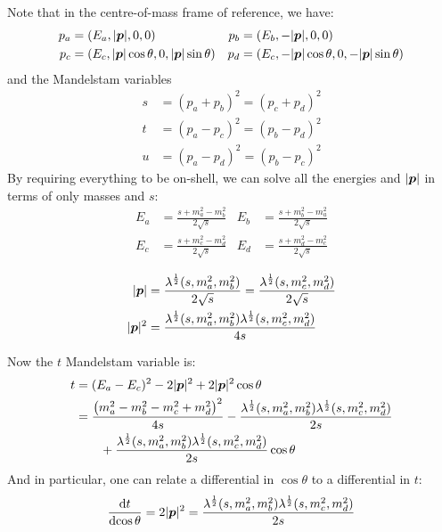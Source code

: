 \documentclass[
  a4paper,             %
  11pt,                %
  oneside,             %
  onecolumn,           %
  bibliography=totoc,  %
  final,               %
]{scrartcl}
\begin{document}
Note that in the centre-of-mass frame of reference, we have:
\begin{align}
  p_a & = (E_a, \lvert\boldsymbol{p}\rvert, 0, 0)                                       & p_b & = (E_b, -\lvert\boldsymbol{p}\rvert, 0, 0) \\
  p_c & = (E_c, \lvert\boldsymbol{p}\rvert \cos \theta, 0, \lvert\boldsymbol{p}\rvert \sin \theta)     &
  p_d & = (E_c, - \lvert\boldsymbol{p}\rvert \cos \theta, 0, - \lvert\boldsymbol{p}\rvert \sin \theta)
\end{align}
and the Mandelstam variables
\begin{align}
  s & = (p_a + p_b)^2 = (p_c + p_d)^2 \\
  t & = (p_a - p_c)^2 = (p_b - p_d)^2 \\
  u & = (p_a - p_d)^2 = (p_b - p_c)^2
\end{align}
By requiring everything to be on-shell, we can solve all the energies and
\(\lvert\boldsymbol{p}\rvert\) in terms of only masses and \(s\):
\begin{align}
  E_a & = \frac{s + m_a^2 - m_b^2}{2 \sqrt{s}} &
  E_b & = \frac{s + m_b^2 - m_a^2}{2 \sqrt{s}}   \\
  E_c & = \frac{s + m_c^2 - m_d^2}{2 \sqrt{s}} &
  E_d & = \frac{s + m_d^2 - m_c^2}{2 \sqrt{s}}   \\
\end{align}
\begin{equation}
  \begin{aligned}
    \lvert\boldsymbol{p}\rvert   & = \frac{\lambda^{\frac{1}{2}}(s, m_a^2, m_b^2)}{2 \sqrt{s}} = \frac{\lambda^{\frac{1}{2}}(s, m_c^2, m_d^2)}{2 \sqrt{s}} \\
    \lvert\boldsymbol{p}\rvert^2 & = \frac{\lambda^{\frac{1}{2}}(s, m_a^2, m_b^2) \lambda^{\frac{1}{2}}(s, m_c^2, m_d^2)}{4 s}
  \end{aligned}
\end{equation}

Now the \(t\) Mandelstam variable is:
\begin{align}
  t & = (E_a - E_c)^2 - 2 \lvert\boldsymbol{p}\rvert^2 + 2 \lvert\boldsymbol{p}\rvert^2 \cos \theta                                                \\
    & = \frac{\left( m_a^2 - m_b^2 - m_c^2 + m_d^2 \right)^2}{4 s}
  - \frac{\lambda^{\frac{1}{2}}(s, m_a^2, m_b^2) \lambda^{\frac{1}{2}}(s, m_c^2, m_d^2)}{2 s}                        \\
    & \qquad + \frac{\lambda^{\frac{1}{2}}(s, m_a^2, m_b^2) \lambda^{\frac{1}{2}}(s, m_c^2, m_d^2)}{2 s} \cos \theta
\end{align}
And in particular, one can relate a differential in \(\cos \theta\) to a differential in \(t\):
\begin{equation}
  \label{eq:t_angular}
  \frac{\mathop{}\!\mathrm{d}{t}}{\mathop{}\!\mathrm{d}{\cos \theta}} = 2 \lvert\boldsymbol{p}\rvert^2 = \frac{\lambda^{\frac{1}{2}}(s, m_a^2, m_b^2) \lambda^{\frac{1}{2}}(s, m_c^2, m_d^2)}{2 s}
\end{equation}
\end{document}
